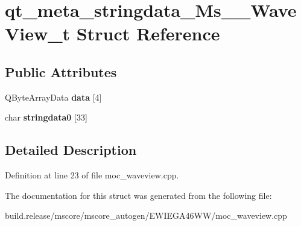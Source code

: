 \hypertarget{structqt__meta__stringdata___ms_____wave_view__t}{}\section{qt\+\_\+meta\+\_\+stringdata\+\_\+\+Ms\+\_\+\+\_\+\+Wave\+View\+\_\+t Struct Reference}
\label{structqt__meta__stringdata___ms_____wave_view__t}
\subsection*{Public Attributes}
\begin{DoxyCompactItemize}
\item 
\mbox{\label{structqt__meta__stringdata___ms_____wave_view__t_a1151eb0beb9a7c54da24280e21f1586f}} 
Q\+Byte\+Array\+Data {\bfseries data} \mbox{[}4\mbox{]}
\item 
\mbox{\label{structqt__meta__stringdata___ms_____wave_view__t_a8fc73fda67cc867808a9f90f51c523eb}} 
char {\bfseries stringdata0} \mbox{[}33\mbox{]}
\end{DoxyCompactItemize}


\subsection{Detailed Description}


Definition at line 23 of file moc\+\_\+waveview.\+cpp.



The documentation for this struct was generated from the following file\+:\begin{DoxyCompactItemize}
\item 
build.\+release/mscore/mscore\+\_\+autogen/\+E\+W\+I\+E\+G\+A46\+W\+W/moc\+\_\+waveview.\+cpp\end{DoxyCompactItemize}
